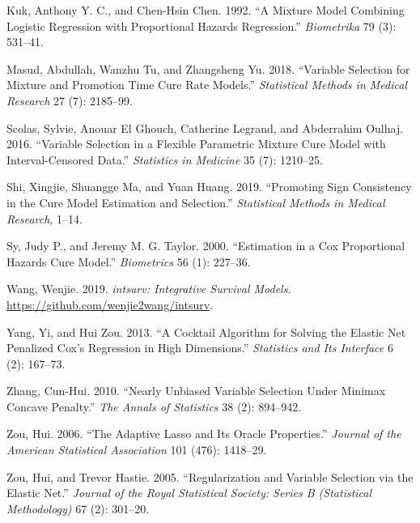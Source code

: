\leavevmode\hypertarget{ref-kuk1992biometrika}{}%
Kuk, Anthony Y. C., and Chen-Hsin Chen. 1992. ``A Mixture Model
Combining Logistic Regression with Proportional Hazards Regression.''
\emph{Biometrika} 79 (3): 531--41.

\leavevmode\hypertarget{ref-masud2018smimr}{}%
Masud, Abdullah, Wanzhu Tu, and Zhangsheng Yu. 2018. ``Variable
Selection for Mixture and Promotion Time Cure Rate Models.''
\emph{Statistical Methods in Medical Research} 27 (7): 2185--99.

\leavevmode\hypertarget{ref-scolas2016sim}{}%
Scolas, Sylvie, Anouar El Ghouch, Catherine Legrand, and Abderrahim
Oulhaj. 2016. ``Variable Selection in a Flexible Parametric Mixture Cure
Model with Interval-Censored Data.'' \emph{Statistics in Medicine} 35
(7): 1210--25.

\leavevmode\hypertarget{ref-shi2019smmr}{}%
Shi, Xingjie, Shuangge Ma, and Yuan Huang. 2019. ``Promoting Sign
Consistency in the Cure Model Estimation and Selection.''
\emph{Statistical Methods in Medical Research}, 1--14.

\leavevmode\hypertarget{ref-sy2000biometrics}{}%
Sy, Judy P., and Jeremy M. G. Taylor. 2000. ``Estimation in a Cox
Proportional Hazards Cure Model.'' \emph{Biometrics} 56 (1): 227--36.

\leavevmode\hypertarget{ref-intsurv-package}{}%
Wang, Wenjie. 2019. \emph{intsurv: Integrative Survival Models}.
\url{https://github.com/wenjie2wang/intsurv}.

\leavevmode\hypertarget{ref-yang2013sii}{}%
Yang, Yi, and Hui Zou. 2013. ``A Cocktail Algorithm for Solving the
Elastic Net Penalized Cox's Regression in High Dimensions.''
\emph{Statistics and Its Interface} 6 (2): 167--73.

\leavevmode\hypertarget{ref-zhang2010aos}{}%
Zhang, Cun-Hui. 2010. ``Nearly Unbiased Variable Selection Under Minimax
Concave Penalty.'' \emph{The Annals of Statistics} 38 (2): 894--942.

\leavevmode\hypertarget{ref-zou2006jasa}{}%
Zou, Hui. 2006. ``The Adaptive Lasso and Its Oracle Properties.''
\emph{Journal of the American Statistical Association} 101 (476):
1418--29.

\leavevmode\hypertarget{ref-zouHastie2005jrssb}{}%
Zou, Hui, and Trevor Hastie. 2005. ``Regularization and Variable
Selection via the Elastic Net.'' \emph{Journal of the Royal Statistical
Society: Series B (Statistical Methodology)} 67 (2): 301--20.
